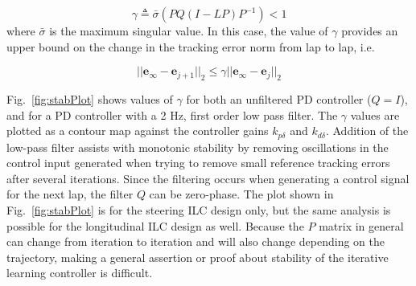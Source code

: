 \documentclass[9pt,shortpaper,twoside,web]{ieeecolor}
\begin{document}
{{{\begin{equation}
	\gamma \triangleq \bar{\sigma}(PQ(I-LP)P^{-1}) < 1
	\label{eq:MS}
\end{equation}
where $\bar{\sigma}$ is the maximum singular value. In this case, the value of $\gamma$ provides an upper bound on the change
 in the tracking error norm from lap to lap, i.e. 
 
\begin{equation}
	||\mathbf{e}_\infty - \mathbf{e}_{j+1}||_2 \leq \gamma ||\mathbf{e}_\infty-\mathbf{e}_j||_2
\end{equation}

Fig.~\ref{fig:stabPlot} shows values of $\gamma$ for both an unfiltered PD controller ($Q = I$), and for a PD controller with a 2 Hz, first order low pass filter. The $\gamma$ values are plotted as a
contour map against the controller gains $k_{p\delta}$ and $k_{d\delta}$. Addition of the low-pass filter
assists with monotonic stability by removing oscillations in the control input generated when trying to remove small reference tracking errors after several iterations. Since the filtering occurs when generating a control signal for the next lap, the filter $Q$ can be zero-phase. 
The plot shown in Fig.~\ref{fig:stabPlot} is for the steering ILC design only, but the same analysis is possible for the longitudinal
ILC design as well. Because the $P$ matrix in general can change from iteration to iteration and will also
 change depending on the trajectory, making a general assertion or proof about stability of the iterative learning controller is difficult. 

}}}
\end{document}
